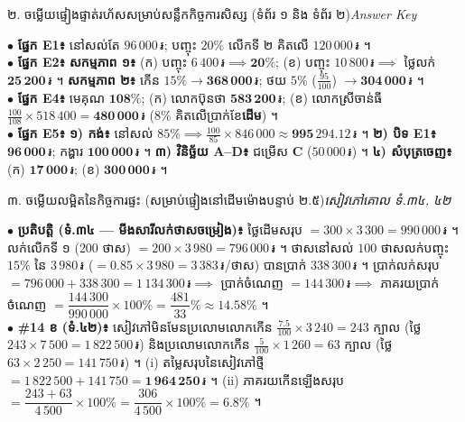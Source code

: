 \documentclass[a4paper,10pt]{article}
\newcommand{\en}[1]{{\TimesEn #1}}
\newcommand{\riel}{\,\text{៛}}
\newcommand{\secstrip}[2]{%
  \vspace{3pt}%
  \begin{tcolorbox}[
    enhanced, sharp corners, colback=panelgray, colframe=black,
    boxrule=0.8pt, boxsep=0.8pt, top=2pt, bottom=2pt, left=5pt, right=5pt,
    after skip=3pt
  ]
    {\muol\fontsize{8.5pt}{12.2pt}\selectfont #1}\hfill{\fontsize{7.8pt}{10.8pt}\selectfont\textit{#2}}
  \end{tcolorbox}%
}
\begin{document}
\secstrip{២. ចម្លើយផ្ទៀងផ្ទាត់រហ័សសម្រាប់សន្លឹកកិច្ចការសិស្ស (ទំព័រ ១ និង ទំព័រ ២)}{\en{Answer Key}}

\begin{tcolorbox}[
  enhanced, sharp corners, colback=white, colframe=black,
  boxrule=0.8pt, boxsep=1.5pt, top=3pt, bottom=3pt, left=5pt, right=5pt,
  after skip=3.5pt
]
  \fontsize{8.8pt}{13.2pt}\selectfont
  $\bullet$ \textbf{ផ្នែក \en{E1}៖} នៅសល់តែ \textbf{$96\,000\riel$}; បញ្ចុះ $20\%$ លើកទី ២ គិតលើ \textbf{$120\,000\riel$} ។\\[2pt]
  $\bullet$ \textbf{ផ្នែក \en{E2}៖} \textbf{សកម្មភាព ១៖} (ក) បញ្ចុះ $6\,400\riel \implies \mathbf{20\%}$; (ខ) បញ្ចុះ $10\,800\riel \implies$ ថ្លៃលក់ $\mathbf{25\,200\riel}$ ។ \textbf{សកម្មភាព ២៖} កើន $15\% \to \mathbf{368\,000\riel}$; ថយ $5\%$ ($\frac{95}{100}$) $\to \mathbf{304\,000\riel}$ ។\\[2pt]
  $\bullet$ \textbf{ផ្នែក \en{E4}៖} មេគុណ $\mathbf{108\%}$; (ក) លោកប៊ុនថា $\mathbf{583\,200\riel}$; (ខ) លោកស្រីចាន់ធី $\frac{100}{108}\times 518\,400 = \mathbf{480\,000\riel}$ ($8\%$ គិតលើប្រាក់ខែ\textbf{ដើម}) ។\\[2pt]
  $\bullet$ \textbf{ផ្នែក \en{E5}៖} \textbf{១) កង់៖} នៅសល់ $85\% \implies \frac{100}{85}\times 846\,000 \approx \mathbf{995\,294.12\riel}$ ។ \textbf{២) បិទ \en{E1}៖} $\mathbf{96\,000\riel}$; កង្ហារ $\mathbf{100\,000\riel}$ ។ \textbf{៣) វិនិច្ឆ័យ \en{A--D}៖} ជម្រើស \textbf{\en{C}} ($50\,000\riel$) ។ \textbf{៤) សំបុត្រចេញ៖} (ក) $\mathbf{17\,000\riel}$; (ខ) $\mathbf{300\,000\riel}$ ។
\end{tcolorbox}

\secstrip{៣. ចម្លើយលម្អិតនៃកិច្ចការផ្ទះ (សម្រាប់ផ្ទៀងនៅដើមម៉ោងបន្ទាប់ ២.៥)}{សៀវភៅគោល ទំ.៣៤, ៤២}

\begin{tcolorbox}[
  enhanced, sharp corners, colback=white, colframe=black,
  boxrule=0.8pt, boxsep=1.5pt, top=3pt, bottom=3pt, left=5pt, right=5pt
]
  \fontsize{8.6pt}{12.8pt}\selectfont
  $\bullet$ \textbf{ប្រតិបត្តិ (ទំ.៣៤ — មីងសារីលក់ថាសចម្រៀង)៖} ថ្លៃដើមសរុប $= 300 \times 3\,300 = 990\,000\riel$ ។ លក់លើកទី ១ ($200$ ថាស) $= 200 \times 3\,980 = 796\,000\riel$ ។ ថាសនៅសល់ $100$ ថាសលក់បញ្ចុះ $15\%$ នៃ $3\,980\riel$ ($= 0.85 \times 3\,980 = 3\,383\riel$/ថាស) បានប្រាក់ $338\,300\riel$ ។ ប្រាក់លក់សរុប $= 796\,000 + 338\,300 = 1\,134\,300\riel \implies$ ប្រាក់ចំណេញ $= 144\,300\riel \implies$ ភាគរយប្រាក់ចំណេញ $= \dfrac{144\,300}{990\,000}\times 100\% = \dfrac{481}{33}\% \approx \mathbf{14.58\%}$ ។\\[3pt]
  $\bullet$ \textbf{\#14 ខ (ទំ.៤២)៖} សៀវភៅមិនមែនប្រលោមលោកកើន $\frac{7.5}{100}\times 3\,240 = 243$ ក្បាល (ថ្លៃ $243\times 7\,500 = 1\,822\,500\riel$) និងប្រលោមលោកកើន $\frac{5}{100}\times 1\,260 = 63$ ក្បាល (ថ្លៃ $63\times 2\,250 = 141\,750\riel$) ។ \en{(i)} តម្លៃសរុបនៃសៀវភៅថ្មី $= 1\,822\,500 + 141\,750 = \mathbf{1\,964\,250\riel}$ ។ \en{(ii)} ភាគរយកើនឡើងសរុប $= \dfrac{243 + 63}{4\,500}\times 100\% = \dfrac{306}{4\,500}\times 100\% = \mathbf{6.8\%}$ ។
\end{tcolorbox}
\end{document}
